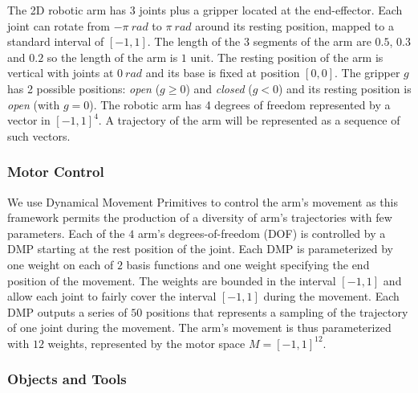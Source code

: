 \documentclass[10pt,letterpaper]{article}
\begin{document}
			The 2D robotic arm has $3$ joints plus a gripper located at the end-effector.
			Each joint can rotate from $-\pi~rad$ to $\pi~rad$ around its resting position, mapped to a standard interval of $[-1,1]$.
			The length of the $3$ segments of the arm are $0.5$, $0.3$ and $0.2$ so the length of the arm is $1$ unit.
			The resting position of the arm is vertical with joints at $0~rad$ and its base is fixed at position $[0, 0]$.
			The gripper $g$ has 2 possible positions: \textit{open} ($g \geq 0$) and \textit{closed} ($g < 0$) and its resting position is \textit{open} (with $g = 0$).
			The robotic arm has 4 degrees of freedom represented by a vector in $[-1,1]^4$.
			A trajectory of the arm will be represented as a sequence of such vectors.
		
		
		\subsubsection{Motor Control}
		
			We use Dynamical Movement Primitives \cite{ijspeert_dynamical_2013} to control the arm's movement as this framework permits the production of a diversity of arm's trajectories with few parameters.
			Each of the $4$ arm's degrees-of-freedom (DOF) is controlled by a DMP starting at the rest position of the joint.
			Each DMP is parameterized by one weight on each of $2$ basis functions and one weight specifying the end position of the movement.
			The weights are bounded in the interval $[-1,1]$ and allow each joint to fairly cover the interval $[-1,1]$ during the movement.
			Each DMP outputs a series of $50$ positions that represents a sampling of the trajectory of one joint during the movement.		
			The arm's movement is thus parameterized with $12$ weights, represented by the motor space $M=[-1,1]^{12}$.
		
			
		\subsubsection{Objects and Tools}
			
\end{document}
